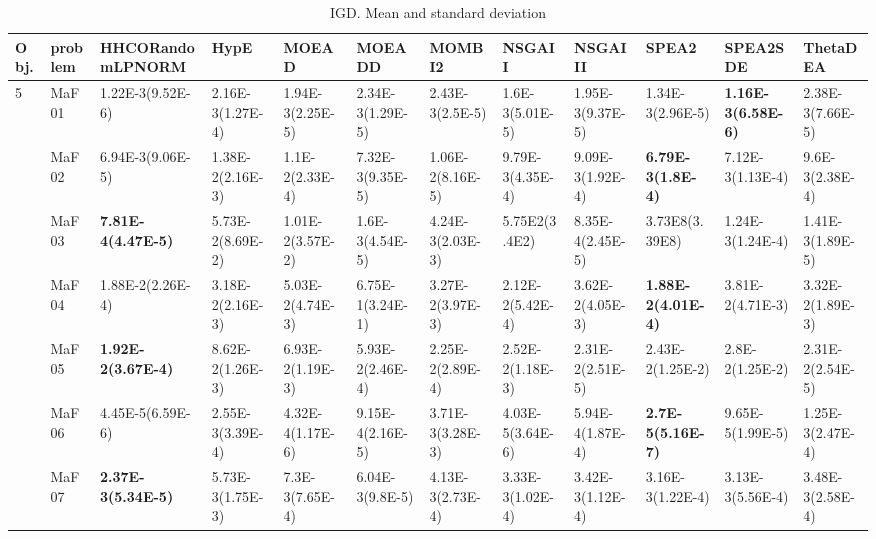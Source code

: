 \documentclass[]{article}
\begin{document}
\begin{landscape}
\begin{table}
\caption{IGD. Mean and standard deviation}
\label{table:mean.IGD}
\centering
\begin{footnotesize}
\begin{tabular}{|l|l|l|l|l|l|l|l|l|l|l|l|}
\hline
Obj. & problem  & HHCORandomLPNORM & HypE & MOEAD & MOEADD & MOMBI2 & NSGAII & NSGAIII & SPEA2 & SPEA2SDE & ThetaDEA \\ \hline

\multirow{15}{*}{5} & MaF01 & \cellcolor{gray95} 1.22E-3(9.52E-6) & 2.16E-3(1.27E-4) & 1.94E-3(2.25E-5) & 2.34E-3(1.29E-5) & 2.43E-3(2.5E-5) & 1.6E-3(5.01E-5) & 1.95E-3(9.37E-5) & \cellcolor{gray95} 1.34E-3(2.96E-5) & \cellcolor{gray95} {\bf 1.16E-3(6.58E-6)} & 2.38E-3(7.66E-5)\\
 & MaF02 & \cellcolor{gray95} 6.94E-3(9.06E-5) & 1.38E-2(2.16E-3) & 1.1E-2(2.33E-4) & \cellcolor{gray95} 7.32E-3(9.35E-5) & 1.06E-2(8.16E-5) & 9.79E-3(4.35E-4) & 9.09E-3(1.92E-4) & \cellcolor{gray95} {\bf 6.79E-3(1.8E-4)} & \cellcolor{gray95} 7.12E-3(1.13E-4) & 9.6E-3(2.38E-4)\\
 & MaF03 & \cellcolor{gray95} {\bf 7.81E-4(4.47E-5)} & 5.73E-2(8.69E-2) & 1.01E-2(3.57E-2) & 1.6E-3(4.54E-5) & 4.24E-3(2.03E-3) & 5.75E2(3.4E2) & \cellcolor{gray95} 8.35E-4(2.45E-5) & 3.73E8(3.39E8) & \cellcolor{gray95} 1.24E-3(1.24E-4) & \cellcolor{gray95} 1.41E-3(1.89E-5)\\
 & MaF04 & \cellcolor{gray95} 1.88E-2(2.26E-4) & 3.18E-2(2.16E-3) & 5.03E-2(4.74E-3) & 6.75E-1(3.24E-1) & 3.27E-2(3.97E-3) & \cellcolor{gray95} 2.12E-2(5.42E-4) & 3.62E-2(4.05E-3) & \cellcolor{gray95} {\bf 1.88E-2(4.01E-4)} & 3.81E-2(4.71E-3) & 3.32E-2(1.89E-3)\\
 & MaF05 & \cellcolor{gray95} {\bf 1.92E-2(3.67E-4)} & 8.62E-2(1.26E-3) & 6.93E-2(1.19E-3) & 5.93E-2(2.46E-4) & \cellcolor{gray95} 2.25E-2(2.89E-4) & 2.52E-2(1.18E-3) & 2.31E-2(2.51E-5) & \cellcolor{gray95} 2.43E-2(1.25E-2) & 2.8E-2(1.25E-2) & 2.31E-2(2.54E-5)\\
 & MaF06 & \cellcolor{gray95} 4.45E-5(6.59E-6) & 2.55E-3(3.39E-4) & 4.32E-4(1.17E-6) & 9.15E-4(2.16E-5) & 3.71E-3(3.28E-3) & \cellcolor{gray95} 4.03E-5(3.64E-6) & 5.94E-4(1.87E-4) & \cellcolor{gray95} {\bf 2.7E-5(5.16E-7)} & 9.65E-5(1.99E-5) & 1.25E-3(2.47E-4)\\
 & MaF07 & \cellcolor{gray95} {\bf 2.37E-3(5.34E-5)} & 5.73E-3(1.75E-3) & 7.3E-3(7.65E-4) & 6.04E-3(9.8E-5) & 4.13E-3(2.73E-4) & 3.33E-3(1.02E-4) & 3.42E-3(1.12E-4) & \cellcolor{gray95} 3.16E-3(1.22E-4) & \cellcolor{gray95} 3.13E-3(5.56E-4) & 3.48E-3(2.58E-4)\\

\end{tabular}
\end{footnotesize}
\end{table}
\end{landscape}
\end{document}
